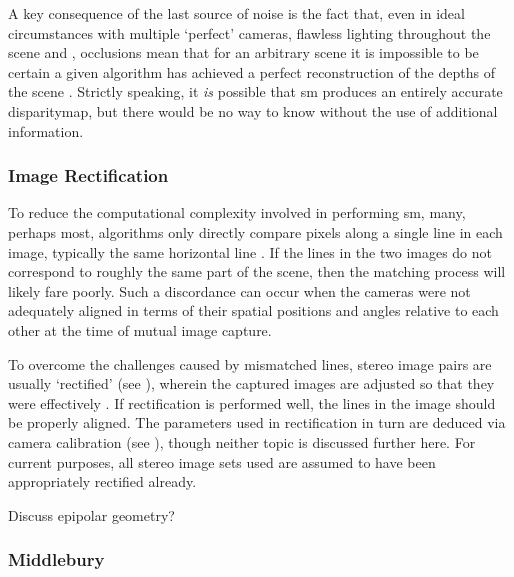 A key consequence of the last source of noise is the fact that, even in ideal circumstances with multiple `perfect' cameras, flawless lighting throughout the scene and , occlusions mean that for an arbitrary scene it is impossible to be certain a given algorithm has achieved a perfect reconstruction of the depths of the scene \cite{Gimelfarb1998}.  Strictly speaking, it \emph{is} possible that \gls{sm} produces an entirely accurate \gls{disparitymap}, but there would be no way to know without the use of additional information.


\subsubsection{Image Rectification}
To reduce the computational complexity involved in performing \gls{sm}, many, perhaps most, algorithms only directly compare pixels along a single line in each image, typically the same horizontal line \cite[Ch. 11]{Szeliski2011}.  If the lines in the two images do not correspond to roughly the same part of the scene, then the matching process will likely fare poorly.  Such a discordance can occur when the cameras were not adequately aligned in terms of their spatial positions and angles relative to each other at the time of mutual image capture.

To overcome the challenges caused by mismatched lines, stereo image pairs are usually `rectified' (see \eg{} \cite[Ch. 1.5.1]{Wohler2013}), wherein the captured images are adjusted so that they were effectively .  If rectification is performed well, the lines in the image should be properly aligned.  The parameters used in rectification in turn are deduced via camera calibration (see \eg{} \cite[Ch. 1.4]{Wohler2013}), though neither topic is discussed further here.  For current purposes, all stereo image sets used are assumed to have been appropriately rectified already.

\begin{anfxnote}{}
    Discuss epipolar geometry?
\end{anfxnote}

\subsubsection{Middlebury}

